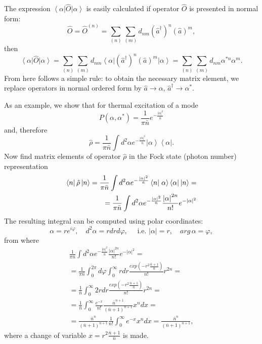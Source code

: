 The expression $\left<\alpha\right|\hat{O}\left|\alpha\right>$ is easily calculated if operator $\hat{O}$ is presented in normal form:
\begin{equation}
\hat{O} = \hat{O}^{(n)} = \sum_{(n)}\sum_{(m)} d_{nm}
\left(\hat{a}^{\dag}\right)^n
\left(\hat{a}\right)^m,
\label{eqCh1_normalO}
\end{equation}
then
\begin{equation}
\left<\alpha\right|\hat{O}\left|\alpha\right> = 
\sum_{(n)}\sum_{(m)} d_{nm}
\left<\alpha\right|
\left(\hat{a}^{\dag}\right)^n
\left(\hat{a}\right)^m
\left|\alpha\right> = 
\sum_{(n)}\sum_{(m)} d_{nm}
\alpha^{*n}\alpha^{m}.
\end{equation}
From here follows a simple rule: to obtain the necessary matrix element, we replace operators in normal ordered form by $\hat{a}\rightarrow\alpha$, 
$\hat{a}^{\dag}\rightarrow\alpha^{*}$.

As an example, we show that for thermal excitation of a mode 
\begin{equation}
P\left(\alpha, \alpha^{*}\right) = \frac{1}{\pi \bar{n}}
e^{- \frac{\left|\alpha\right|^2}{\bar{n}}}
\label{eqCh1_123a}
\end{equation}
and, therefore
\[
\hat{\rho} = \frac{1}{\pi \bar{n}}
\int d^2 \alpha 
e^{- \frac{\left|\alpha\right|^2}{\bar{n}}}
\left|\alpha\right>
\left<\alpha\right|.
\]
Now find matrix elements of operator $\hat{\rho}$ in the Fock state (photon number) representation
\begin{eqnarray}
\bra{n}
\hat{\rho}
\ket{n} = 
\frac{1}{\pi \bar{n}}
\int d^2 \alpha 
e^{- \frac{\left|\alpha\right|^2}{\bar{n}}}
\bra{n}\left.\alpha\right>
\left<\alpha\right|
\ket{n} = 
\nonumber \\
= 
\frac{1}{\pi \bar{n}}
\int d^2 \alpha 
e^{- \frac{\left|\alpha\right|^2}{\bar{n}}}
\frac{\left|\alpha\right|^{2n}}{n!} 
e^{- \left|\alpha\right|^2} 
\nonumber 
\end{eqnarray}
The resulting integral can be computed using polar coordinates:
\[
\alpha = r e^{i \varphi}, \quad 
d^2 \alpha = r d r d \varphi , \quad 
\mbox{ i.e. } 
\left|\alpha\right| = r, \quad arg\,\alpha = \varphi,
\]
from where
\begin{eqnarray}
\frac{1}{\pi \bar{n}}
\int d^2 \alpha 
e^{- \frac{\left|\alpha\right|^2}{\bar{n}}}
\frac{\left|\alpha\right|^{2n}}{n!} 
e^{- \left|\alpha\right|^2} =
\nonumber \\
=
\frac{1}{\pi \bar{n}}
\int_0^{2 \pi} d \varphi 
\int_0^{\infty}
r dr \frac{exp \left(- r^2\frac{\bar{n} + 1}{\bar{n}}\right)}{n!} r^{2n}= 
\nonumber \\
= 
\frac{1}{\bar{n}}
\int_0^{\infty}
2 r dr \frac{exp \left(- r^2\frac{\bar{n} + 1}{\bar{n}}\right)}{n!}  r^{2n} = 
\nonumber \\
= 
\frac{1}{\bar{n}}
\int_0^{\infty}
\frac{e^{-x}}{n!}\frac{\bar{n}^{n + 1}}
{\left(\bar{n} + 1\right)^{n + 1}}x^n dx = 
\nonumber \\
=
\frac{\bar{n}^{n}}
{\left(\bar{n} + 1\right)^{n + 1}}
\frac{1}{n!}
\int_0^{\infty}
e^{-x}x^n dx = 
\frac{\bar{n}^{n}}
{\left(\bar{n} + 1\right)^{n + 1}},
\label{eqCh1_matrelemRho}
\end{eqnarray}
where a change of variable $x = r^2\frac{\bar{n} + 1}{\bar{n}}$ is made.

